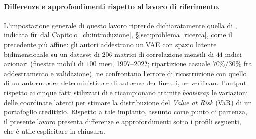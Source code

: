 \paragraph{Differenze e approfondimenti rispetto al lavoro di riferimento.} L'impostazione generale di questo lavoro riprende dichiaratamente quella di \citet{caprioli2024ptfvae}, indicata fin dal Capitolo~\ref{ch:introduzione}, \S\ref{sec:problema_ricerca}, come il precedente più affine: gli autori addestrano un VAE con spazio latente bidimensionale su un dataset di $206$ matrici di correlazione mensili di $44$ indici azionari (finestre mobili di $100$ mesi, 1997--2022; ripartizione casuale $70\%/30\%$ fra addestramento e validazione), ne confrontano l'errore di ricostruzione con quello di un autoencoder deterministico e di autoencoder lineari, ne verificano l'output rispetto ai cinque fatti stilizzati di \citet{marti2019corrgan} e ricampionano tramite \emph{bootstrap} le variazioni delle coordinate latenti per stimare la distribuzione del \emph{Value at Risk} (VaR) di un portafoglio creditizio. Rispetto a tale impianto, assunto come punto di partenza, il presente lavoro presenta differenze e approfondimenti sotto i profili seguenti, che è utile esplicitare in chiusura.
